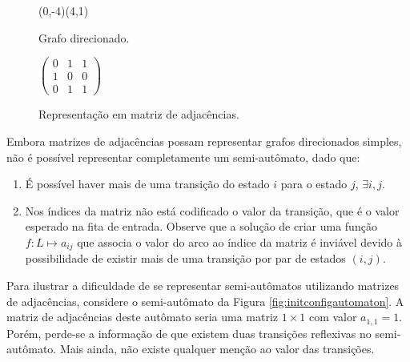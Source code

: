 \documentclass[12pt,a4paper]{article}
\begin{document}
\begin{figure}[ht]
\begin{minipage}[b]{0.5\linewidth}
\begin{center}
\begin{VCPicture}{(0,-4)(4,1)}
 
  
 
\end{VCPicture}
\caption{Grafo direcionado.}
\label{fig:graph}
\end{center}
\end{minipage}
\hspace{0.5cm}
\begin{minipage}[b]{0.5\linewidth}
\begin{center}
\begin{math}
\begin{pmatrix}
0 & 1 & 1 \\
1 & 0 & 0 \\
0 & 1 & 1
\end{pmatrix}
\end{math}
\caption{Representação em matriz de adjacências.}
\label{fig:adjm}
\end{center}
\end{minipage}
\end{figure}

Embora matrizes de adjacências possam representar grafos direcionados simples,
não é possível representar completamente um semi-autômato, dado que:

\begin{enumerate}
\item É possível haver mais de uma transição do estado $i$ para o estado
$j$, $\exists i,j$.

\item Nos índices da matriz não está codificado o valor da transição, que
é o valor esperado na fita de entrada. Observe que a solução de criar
uma função $f: L \mapsto a_{ij}$ que associa o valor do arco ao índice
da matriz é inviável devido à possibilidade de existir mais de uma
transição por par de estados $(i,j)$.
\end{enumerate}

Para ilustrar a dificuldade de se representar semi-autômatos utilizando
matrizes de adjacências, considere o semi-autômato da Figura
\ref{fig:initconfigautomaton}. A matriz de adjacências deste autômato
seria uma matriz $1 \times 1$ com valor $a_{1,1}=1$. Porém, perde-se a informação
de que existem duas transições reflexivas no semi-autômato. Mais ainda,
não existe qualquer menção ao valor das transições.
\end{document}
